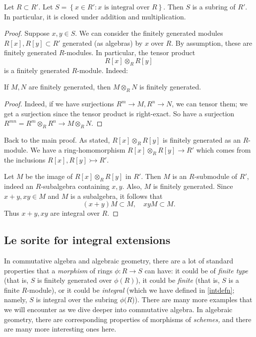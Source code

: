 \begin{theorem}
Let $R \subset R'$. Let $S = \left\{x \in R': x \text{ is integral over }
R\right\}$. Then $S$ is a subring of $R'$. In particular, it is closed under
addition and multiplication.
\end{theorem}
\begin{proof}
Suppose $x,y \in S$.
We can consider the finitely generated modules $R[x], R[y] \subset R'$
generated (as algebras) by $x$ over $R$. By assumption, these are finitely
generated $R$-modules. In particular, the tensor product
\[ R[x] \otimes_R R[y]  \]
is a finitely generated $R$-module.
Indeed:
\begin{lemma}
If $M, N$ are finitely generated, then $M \otimes_R N$ is finitely generated.
\end{lemma}
\begin{proof}
Indeed, if we have surjections $R^m \to M, R^n \to N$, we can tensor them; we
get a surjection since the tensor product is right-exact.
So have a surjection
$R^{m n} = R^m \otimes_R R^n \to M \otimes_R N$.
\end{proof}

Back to the main proof. As stated, $R[x] \otimes_R R[y]$ is finitely generated
as an $R$-module. We have a ring-homomorphism $R[x]\otimes_R R[y] \to R'$
which comes from the inclusions $R[x], R[y] \rightarrowtail R'$.

Let $M$ be the image of $R[x] \otimes_R R[y]$ in $R'$. Then $M$ is an
$R$-submodule of $R'$, indeed an $R$-subalgebra containing $x,y$.  Also, $M$ is
finitely generated. Since $x+y, xy\in M$ and $M$ is a subalgebra, it
follows that
\[ (x+y) M \subset M, \quad xy M \subset M.  \]
Thus $x+y, xy$ are integral over $R$.
\end{proof}

\subsection{Le sorite for integral extensions}

In commutative algebra and algebraic geometry, there are a lot of standard
properties that a \emph{morphism} of rings $\phi: R \to S$ can have: it could
be of \emph{finite type} (that is, $S$ is finitely generated over $\phi(R)$),
it could be \emph{finite} (that is, $S$ is a finite $R$-module), or it could
be \emph{integral} (which we have defined in \cref{intdefn}; namely, $S$ is integral over
the subring $\phi(R$)). There are many more examples
that we will encounter as we dive deeper into commutative algebra.
In algebraic geometry, there are corresponding properties of morphisms of
\emph{schemes,} and there are many more interesting ones here.

